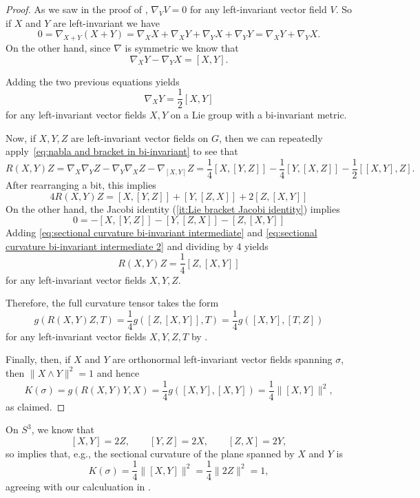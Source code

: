 \begin{proof}
	As we saw in the proof of , $\nabla_VV = 0$ for any left-invariant vector field $V$. So if $X$ and $Y$ are left-invariant we have
	\[
		0 = \nabla_{X+Y}(X+Y) = \nabla_XX + \nabla_XY + \nabla_YX + \nabla_YY = \nabla_XY + \nabla_YX.
	\]
	On the other hand, since $\nabla$ is symmetric we know that
	\[
		\nabla_XY - \nabla_YX = [X,Y].
	\]
	
	Adding the two previous equations yields
	\begin{equation}\label{eq:nabla and bracket in bi-invariant}
		\nabla_XY = \frac{1}{2}[X,Y]
	\end{equation}
	for any left-invariant vector fields $X,Y$ on a Lie group with a bi-invariant metric.
	
	Now, if $X, Y, Z$ are left-invariant vector fields on $G$, then we can repeatedly apply~\eqref{eq:nabla and bracket in bi-invariant} to see that
	\[
		R(X,Y)Z = \nabla_X \nabla_Y Z - \nabla_Y \nabla_X Z - \nabla_{[X,Y]}Z = \frac{1}{4} [X,[Y,Z]] - \frac{1}{4} [Y,[X,Z]] - \frac{1}{2}[[X,Y],Z].
	\]
	After rearranging a bit, this implies
	\begin{equation}\label{eq:sectional curvature bi-invariant intermediate}
		4R(X,Y)Z = [X,[Y,Z]] + [Y,[Z,X]] + 2[Z,[X,Y]]
	\end{equation}
	On the other hand, the Jacobi identity (\ref{it:Lie bracket Jacobi identity}) implies
	\begin{equation}\label{eq:sectional curvature bi-invariant intermediate 2}
		0 = - [X,[Y,Z]] - [Y,[Z,X]] -[Z,[X,Y]] 
	\end{equation}
	Adding \eqref{eq:sectional curvature bi-invariant intermediate} and \eqref{eq:sectional curvature bi-invariant intermediate 2} and dividing by 4 yields
	\[
		R(X,Y)Z = \frac{1}{4} [Z,[X,Y]]
	\]
	for any left-invariant vector fields $X,Y,Z$.
	
	Therefore, the full curvature tensor takes the form
	\[
		g(R(X,Y)Z,T) = \frac{1}{4} g([Z,[X,Y]],T) = \frac{1}{4} g([X,Y],[T,Z])
	\]
	for any left-invariant vector fields $X,Y,Z,T$ by .
	
	Finally, then, if $X$ and $Y$ are orthonormal left-invariant vector fields spanning $\sigma$, then $\|X\wedge Y\|^2 = 1$ and hence
	\[
		K(\sigma) = g(R(X,Y)Y,X) = \frac{1}{4} g([X,Y],[X,Y]) = \frac{1}{4} \|[X,Y]\|^2,
	\]
	as claimed.
\end{proof}

\begin{example}
	On $S^3$, we know that 
	\[
		[X,Y] = 2Z, \qquad [Y,Z] = 2X , \qquad [Z,X] = 2Y,
	\]
	so  implies that, e.g., the sectional curvature of the plane spanned by $X$ and $Y$ is
	\[
		K(\sigma) = \frac{1}{4}\|[X,Y]\|^2 = \frac{1}{4}\|2Z\|^2 = 1,
	\]
	agreeing with our calculuation in .
\end{example}

